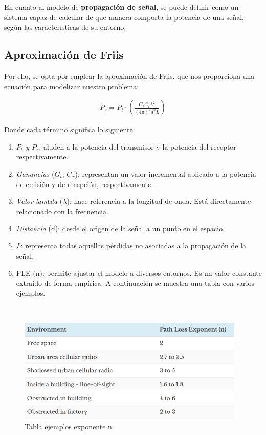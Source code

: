 En cuanto al modelo de \textbf{propagación de señal}, se puede definir como un sistema capaz de calcular de que manera comporta la potencia de una señal, según las características de su entorno.\\

\subsection{Aproximación de Friis}
\label{subsec:friis}

Por ello, se opta por emplear la aproximación de Friis, que nos proporciona una ecuación para  modelizar nuestro problema:

\begin{align}
    P_r = P_t \cdot \left( \frac{G_t G_r \lambda^2 }{(4 \pi)^2 d^n L} \right)
\end{align}

Donde cada término significa lo siguiente:

\begin{enumerate}
    \item \emph{$P_t$ y $P_r$}: aluden a la potencia del transmisor y la potencia del receptor respectivamente.

    \item \emph{Ganancias} ($G_t$, $G_r$): representan un valor incremental aplicado a la potencia de emisión y de recepción, respectivamente.

    \item \emph{Valor lambda} ($\lambda$): hace referencia a la longitud de onda. Está directamente relacionado con la frecuencia.

    \item \emph{Distancia} (d): desde el origen de la señal a un punto en el espacio.

    \item \emph{L}: representa todas aquellas pérdidas no asociadas a la propagación de la señal.

    \item \ac{PLE} (n): permite ajustar el modelo a diversos entornos. Es un valor constante extraido de forma empírica. A continuación se muestra una tabla con varios ejemplos.
\end{enumerate} \cite{friis-1}\\

\begin{figure} [H]
	\begin{center}
	\includegraphics[height=5cm]{imagenes/cap4/4_PLE_table.png}
	\end{center}
	\caption[Tabla ejemplos exponente n]{Tabla ejemplos exponente n}
	\label{fig:ple_table}
\end{figure}

